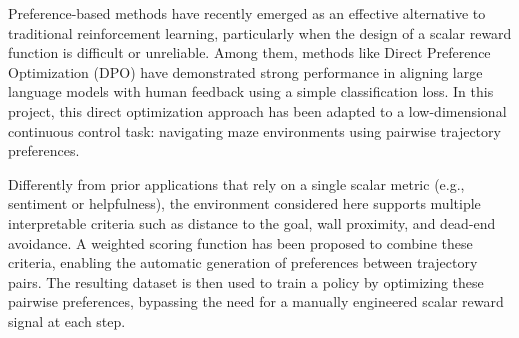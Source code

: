 \documentclass[a4paper,oneside,10pt,ngerman,english]{scrartcl}
\begin{document}
\maketitle


\cleardoubleoddpage
\tableofcontents




\cleardoubleoddpage


Preference-based methods have recently emerged as an effective alternative to traditional reinforcement learning, particularly when the design of a scalar reward function is difficult or unreliable. Among them, methods like Direct Preference Optimization (DPO) have demonstrated strong performance in aligning large language models with human feedback using a simple classification loss. In this project, this direct optimization approach has been adapted to a low-dimensional continuous control task: navigating maze environments using pairwise trajectory preferences.

Differently from prior applications that rely on a single scalar metric (e.g., sentiment or helpfulness), the environment considered here supports multiple interpretable criteria such as distance to the goal, wall proximity, and dead-end avoidance. A weighted scoring function has been proposed to combine these criteria, enabling the automatic generation of preferences between trajectory pairs. The resulting dataset is then used to train a policy by optimizing these pairwise preferences, bypassing the need for a manually engineered scalar reward signal at each step.
\end{document}
